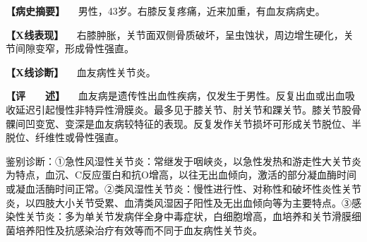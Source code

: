 \textbf{【病史摘要】}
　男性，43岁。右膝反复疼痛，近来加重，有血友病病史。

\textbf{【X线表现】}
　右膝肿胀，关节面双侧骨质破坏，呈虫蚀状，周边增生硬化，关节间隙变窄，形成骨性强直。

\textbf{【X线诊断】} 　血友病性关节炎。

\textbf{【评　　述】}
　血友病是遗传性出血性疾病，仅发生于男性。反复出血或出血吸收延迟引起慢性非特异性滑膜炎。最多见于膝关节、肘关节和踝关节。膝关节股骨髁间凹变宽、变深是血友病较特征的表现。反复发作关节损坏可形成关节脱位、半脱位、纤维性或骨性强直。

鉴别诊断：①急性风湿性关节炎：常继发于咽峡炎，以急性发热和游走性大关节炎为特点，血沉、C反应蛋白和抗O增高，以往无出血倾向，激活的部分凝血酶时间或凝血活酶时间正常。②类风湿性关节炎：慢性进行性、对称性和破坏性炎性关节炎，以四肢大小关节受累、血清类风湿因子阳性及无出血倾向等为主要特点。③感染性关节炎：多为单关节发病伴全身中毒症状，白细胞增高，血培养和关节滑膜细菌培养阳性及抗感染治疗有效等而不同于血友病性关节炎。

\protect\hypertarget{text00008.html}{}{}

